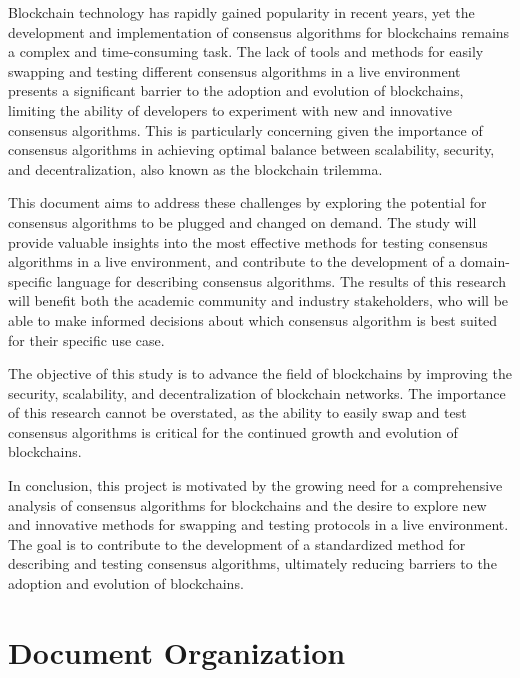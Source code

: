 Blockchain technology has rapidly gained popularity in recent years, yet the development and implementation of consensus algorithms for blockchains remains a complex and time-consuming task. The lack of tools and methods for easily swapping and testing different consensus algorithms in a live environment presents a significant barrier to the adoption and evolution of blockchains, limiting the ability of developers to experiment with new and innovative consensus algorithms. This is particularly concerning given the importance of consensus algorithms in achieving optimal balance between scalability, security, and decentralization, also known as the blockchain trilemma.

This document aims to address these challenges by exploring the potential for consensus algorithms to be plugged and changed on demand. The study will provide valuable insights into the most effective methods for testing consensus algorithms in a live environment, and contribute to the development of a domain-specific language for describing consensus algorithms. The results of this research will benefit both the academic community and industry stakeholders, who will be able to make informed decisions about which consensus algorithm is best suited for their specific use case.

The objective of this study is to advance the field of blockchains by improving the security, scalability, and decentralization of blockchain networks. The importance of this research cannot be overstated, as the ability to easily swap and test consensus algorithms is critical for the continued growth and evolution of blockchains.

In conclusion, this project is motivated by the growing need for a comprehensive analysis of consensus algorithms for blockchains and the desire to explore new and innovative methods for swapping and testing protocols in a live environment. The goal is to contribute to the development of a standardized method for describing and testing consensus algorithms, ultimately reducing barriers to the adoption and evolution of blockchains.

\section{Document Organization}
